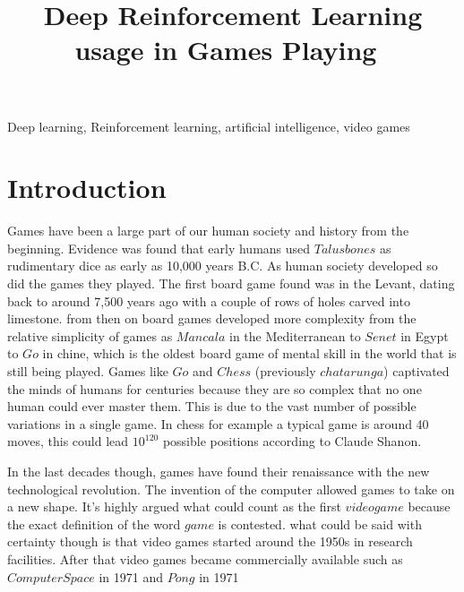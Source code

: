\documentclass[conference]{IEEEtran}
\begin{document}
\title{Deep Reinforcement Learning usage in Games Playing\
}

\author{
}





\maketitle

\begin{abstract}

\end{abstract}

\begin{IEEEkeywords}
Deep learning, Reinforcement learning, artificial intelligence, video games
\end{IEEEkeywords}

\section{Introduction}
Games have been a large part of our human society and history from the beginning. Evidence was found that early humans used $Talus bones$ as rudimentary dice as early as 10,000 years B.C\cite{10.1007/978-981-10-0575-6_1     }. As human society developed so did the games they played. The first board game found was in the Levant, dating back to around 7,500 years ago \cite{simpson2007earliest} with a couple of rows of holes carved into limestone. from then on board games developed more complexity from the relative simplicity of games as $Mancala$ in the Mediterranean to $Senet$ in Egypt to $Go$ in chine, which is the  oldest board game of mental skill in the world that is still being played\cite{shotwell1994game}. Games like $Go$ and $Chess$ (previously $chatarunga$) captivated the minds of humans for centuries because they are so complex that no one human could ever master them. This is due to the vast number of possible variations in a single game. In chess for example a typical game is around 40 moves, this could lead $10^{120}$ possible positions according to Claude Shanon\cite{shannon1950xxii}.

In the last decades though, games have found their renaissance with the new technological revolution. The invention of the computer allowed games to take on a new shape. It's highly argued what could count as the first $video game$ because the exact definition of the word $game$ is contested. what could be said with certainty though is that video games started around the 1950s in research facilities. After that video games became commercially available such as $Computer Space$ in 1971 and $Pong$ in 1971
\end{document}
